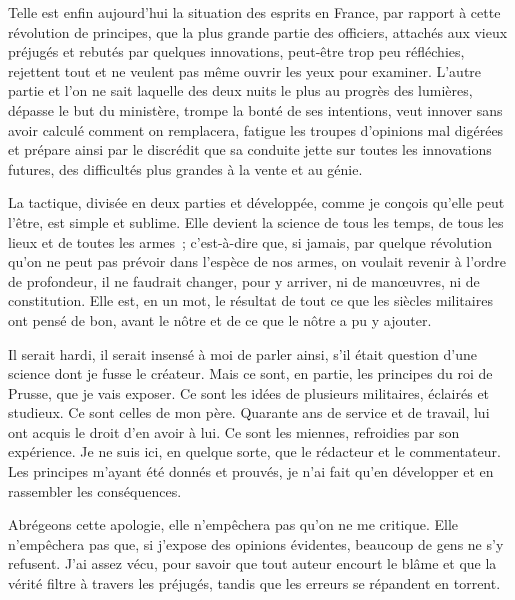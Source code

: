\documentclass[french,twoside]{book} %
\begin{document}
Telle est enfin aujourd’hui la situation des esprits en France, par rapport à cette révolution de principes, que la plus grande partie des officiers, attachés aux vieux préjugés et rebutés par quelques innovations, peut-être trop peu réfléchies, rejettent tout et ne veulent pas même ouvrir les yeux pour examiner. L’autre partie et l’on ne sait laquelle des deux nuits le plus au progrès des lumières, dépasse le but du ministère, trompe la bonté de ses intentions, veut innover sans avoir calculé comment on remplacera, fatigue les troupes d’opinions mal digérées et prépare ainsi par le discrédit que sa conduite jette sur toutes les innovations futures, des difficultés plus grandes à la vente et au génie.\par
La tactique, divisée en deux parties et développée, comme je conçois qu’elle peut l’être, est simple et sublime. Elle devient la science de tous les temps, de tous les lieux et de toutes les armes ; c’est-à-dire que, si jamais, par quelque révolution qu’on ne peut pas prévoir dans l’espèce de nos armes, on voulait revenir à l’ordre de profondeur, il ne faudrait changer, pour y arriver, ni de manœuvres, ni de constitution. Elle est, en un mot, le résultat de tout ce que les siècles militaires ont pensé de bon, avant le nôtre et de ce que le nôtre a pu y ajouter.\par
Il serait hardi, il serait insensé à moi de parler ainsi, s’il était question d’une science dont je fusse le créateur. Mais ce sont, en partie, les principes du roi de Prusse, que je vais exposer. Ce sont les idées de plusieurs militaires, éclairés et studieux. Ce sont celles de mon père. Quarante ans de service et de travail, lui ont acquis le droit d’en avoir à lui. Ce sont les miennes, refroidies par son expérience. Je ne suis ici, en quelque sorte, que le rédacteur et le commentateur. Les principes m’ayant été donnés et prouvés, je n’ai fait qu’en développer et en rassembler les conséquences.\par
Abrégeons cette apologie, elle n’empêchera pas qu’on ne me critique. Elle n’empêchera pas que, si j’expose des opinions évidentes, beaucoup de gens ne s’y refusent. J’ai assez vécu, pour savoir que tout auteur encourt le blâme et que la vérité filtre à travers les préjugés, tandis que les erreurs se répandent en torrent.
\end{document}
